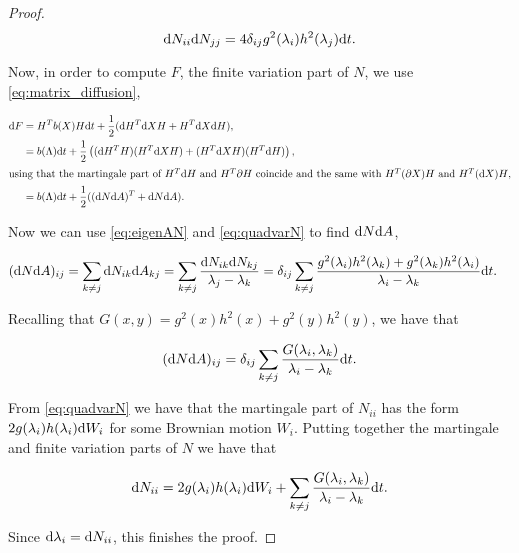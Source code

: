 \begin{proof}
    \begin{equation*}
        \mathrm d N_{ii} \mathrm d N_{jj} = 4\delta_{ij}g^2(\lambda_i)h^2(\lambda_j)\mathrm d t.
    \end{equation*}

    Now, in order to compute $F$, the finite variation part of $N$, we use \eqref{eq:matrix_diffusion},

    \begin{align*}
        \mathrm d F &= H^Tb(X)H\mathrm d t + \frac12(\mathrm d H^T \mathrm d X H + H^T \mathrm d X \mathrm d H),\\
        &= b(\Lambda)\mathrm d t + \frac12 \left( (\mathrm d H^T H)(H^T\mathrm d X H) + (H^T \mathrm d X H)(H^T \mathrm d H) \right),\\
        \intertext{using that the martingale part of $H^T\mathrm d H$ and $H^T\partial H$ coincide and the same with $H^T(\partial X)H$ and $H^T (\mathrm d X) H$,}
        &= b(\Lambda)\mathrm d t + \frac12( (\mathrm d N \mathrm d A)^T + \mathrm d N \mathrm d A).
    \end{align*}

    Now we can use \eqref{eq:eigenAN} and \eqref{eq:quadvarN} to find $\mathrm d N \mathrm d A$,

    \begin{align*}
        (\mathrm d N \mathrm d A)_{ij} &= \sum_{k \neq j} \mathrm d N_{ik}\mathrm d A_{kj} = \sum_{k\neq j} \frac{\mathrm d N_{ik}\mathrm d N_{kj}}{\lambda_j - \lambda_k} = \delta_{ij}\sum_{k\neq j} \frac{ g^2(\lambda_i)h^2(\lambda_k) + g^2(\lambda_k)h^2(\lambda_i) }{\lambda_i - \lambda_k} \mathrm d t.
    \end{align*}

    Recalling that $G(x,y) = g^2(x)h^2(x) + g^2(y)h^2(y)$, we have that

    \begin{equation*}
        (\mathrm d N \mathrm d A)_{ij} = \delta_{ij}\sum_{k\neq j} \frac{ G(\lambda_i,\lambda_k) }{\lambda_i - \lambda_k} \mathrm d t.
    \end{equation*}

    From \eqref{eq:quadvarN} we have that the martingale part of $N_{ii}$ has the form
    $2g(\lambda_i)h(\lambda_i)\mathrm d W_i$ for some Brownian motion $W_i$. Putting together the martingale and finite variation parts of $N$ we have that

    \begin{equation*}
        \mathrm d N_{ii} = 2g(\lambda_i)h(\lambda_i)\mathrm d W_i + \sum_{k\neq j} \frac{ G(\lambda_i,\lambda_k) }{\lambda_i - \lambda_k} \mathrm d t.
    \end{equation*}

    Since $\mathrm d \lambda_i = \mathrm d N_{ii}$, this finishes the proof.
\end{proof}





